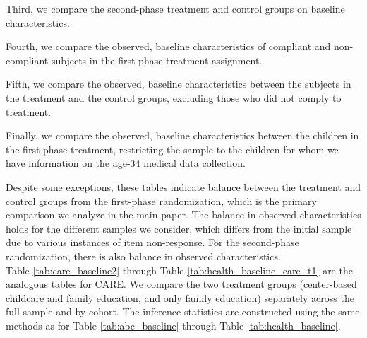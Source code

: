 \begin{appendices}


\noindent Third, we compare the second-phase treatment and control groups on baseline characteristics.



\noindent Fourth, we compare the observed, baseline characteristics of compliant and non-compliant subjects in the first-phase treatment assignment.



\noindent Fifth, we compare the observed, baseline characteristics between the subjects in the treatment and the control groups, excluding those who did not comply to treatment.

\noindent Finally, we compare the observed, baseline characteristics between the children in the first-phase treatment, restricting the sample to the children for whom we have information on the age-34 medical data collection.



\noindent Despite some exceptions, these tables indicate balance between the treatment and control groups from the first-phase randomization, which is the primary comparison we analyze in the main paper. The balance in observed characteristics holds for the different samples we consider, which differs from the initial sample due to various instances of item non-response. For the second-phase randomization, there is also balance in observed characteristics. \\

\noindent Table \ref{tab:care_baseline2} through Table \ref{tab:health_baseline_care_t1} are the analogous tables for CARE. We compare the two treatment groups (center-based childcare and family education, and only family education) separately across the full sample and by cohort. The inference statistics are constructed using the same methods as for Table \ref{tab:abc_baseline} through Table \ref{tab:health_baseline}. \\


\end{appendices}

